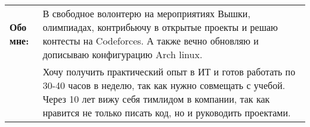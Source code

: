 

\begin{cvparagraph}


  \begin{tabular}{ p{3cm}p{14cm}}

\textbf{Обо мне:} & В свободное волонтерю на мероприятиях Вышки, олимпиадах, контрибьючу в открытые проекты и решаю контесты на Codeforces. А также вечно обновляю и дописываю конфигурацию Arch linux. \\
& Хочу получить практический опыт в ИТ и готов работать по 30-40 часов в неделю, так как нужно совмещать с учебой.
Через 10 лет вижу себя тимлидом в компании, так как нравится не только писать код, но и руководить проектами.

\end{tabular}



\end{cvparagraph}
